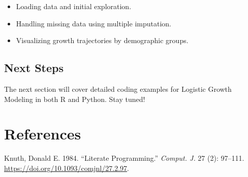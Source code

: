 \documentclass[
  letterpaper,
  DIV=11,
  numbers=noendperiod]{scrreprt}
\providecommand{\tightlist}{%
  \setlength{\itemsep}{0pt}\setlength{\parskip}{0pt}}\usepackage{longtable,booktabs,array}
\newlength{\cslhangindent}
\newenvironment{CSLReferences}[2] %
 {\begin{list}{}{%
  \setlength{\itemindent}{0pt}
  \setlength{\leftmargin}{0pt}
  \setlength{\parsep}{0pt}
  \ifodd #1
   \setlength{\leftmargin}{\cslhangindent}
   \setlength{\itemindent}{-1\cslhangindent}
  \fi
  \setlength{\itemsep}{#2\baselineskip}}}
 {\end{list}}
\begin{document}
\begin{itemize}
\tightlist
\item
  Loading data and initial exploration.
\item
  Handling missing data using multiple imputation.
\item
  Visualizing growth trajectories by demographic groups.
\end{itemize}

\section{Next Steps}\label{next-steps}

The next section will cover detailed coding examples for Logistic Growth
Modeling in both R and Python. Stay tuned!


\chapter*{References}\label{references}


\label{refs}
\begin{CSLReferences}{1}{0}
Knuth, Donald E. 1984. {``Literate Programming.''} \emph{Comput. J.} 27
(2): 97--111. \url{https://doi.org/10.1093/comjnl/27.2.97}.

\end{CSLReferences}
\end{document}
